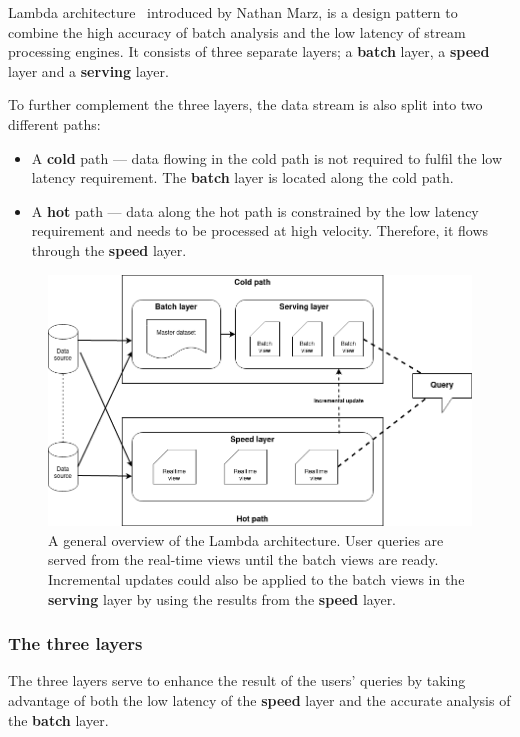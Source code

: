 Lambda architecture~\cite{lambda_arch, lambda_arch_book, lambda_arc_bpost} introduced by Nathan Marz, is a 
design pattern to combine the high accuracy of batch analysis and the low latency of 
stream processing engines. It consists of three separate layers; a \textbf{batch} layer, 
a \textbf{speed} layer and a \textbf{serving} layer. 

To further complement the three layers, 
the data stream is also split into two different paths: 
\begin{itemize}
    \item A \textbf{cold} path --- data flowing in the cold path is not required to fulfil the low
        latency requirement. The \textbf{batch} layer is located along the cold path.   
    \item A \textbf{hot} path --- data along the hot path is constrained by the low latency requirement 
        and needs to be processed at high velocity. Therefore, it flows through the 
        \textbf{speed} layer.  
\end{itemize}

\begin{figure}[!htpb]
    \centering
    \includegraphics[width=\linewidth]{fig/lambda_arch.png}
    \caption{A general overview of the Lambda architecture. User queries are served from 
    the real-time views until the batch views are ready. Incremental updates could also be applied 
to the batch views in the \textbf{serving} layer by using the results from the \textbf{speed} layer.
~\cite{lambda_arch_book}}%
    \label{fig:lambda_arch}
\end{figure}

\subsubsection{The three layers}
The three layers serve to enhance the result of the users' queries by taking 
advantage of both the low latency of the \textbf{speed} layer and the accurate analysis of the \textbf{batch}
layer. 

